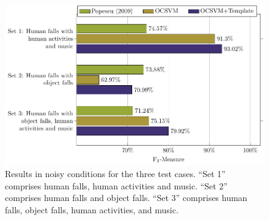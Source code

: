 \begin{figure}[htb]
	\centering
	\includegraphics[width=\columnwidth]{img/cin/res_noisy.pdf}
	\caption{Results in noisy conditions for the three test cases. ``Set 1'' comprises human falls, human activities and music. ``Set 2'' comprises human falls and object falls. ``Set 3'' comprises human falls, object falls, human activities, and music.} \label{fig:res_noisy_}
\end{figure}


